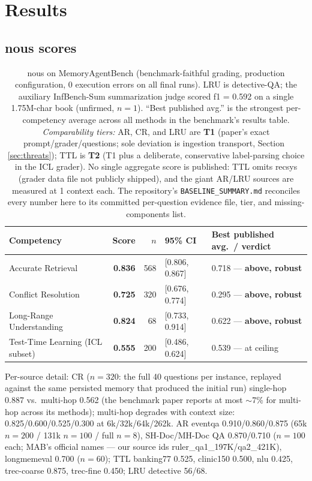\documentclass{article}
\newcommand{\nous}{\textsf{nous}}
\newcommand{\mab}{MemoryAgentBench}
\begin{document}
\section{Results}

\subsection{\nous{} scores}

\begin{table}[h]
\centering
\begin{tabular}{lrrll}
\toprule
Competency & Score & $n$ & 95\% CI & Best published avg.\ / verdict \\
\midrule
Accurate Retrieval        & \textbf{0.836} & 568 & [0.806, 0.867] & 0.718 --- \textbf{above, robust} \\
Conflict Resolution       & \textbf{0.725} & 320 & [0.676, 0.774] & 0.295 --- \textbf{above, robust} \\
Long-Range Understanding  & \textbf{0.824} & 68  & [0.733, 0.914] & 0.622 --- \textbf{above, robust} \\
Test-Time Learning (ICL subset) & \textbf{0.555} & 200 & [0.486, 0.624] & 0.539 --- at ceiling \\
\bottomrule
\end{tabular}
\caption{\nous{} on \mab{} (benchmark-faithful grading, production configuration,
0 execution errors on all final runs). LRU is detective-QA; the auxiliary
InfBench-Sum summarization judge scored f1 = 0.592 on a single 1.75M-char book
(unfirmed, $n{=}1$). ``Best published avg.'' is the strongest per-competency
average across all methods in the benchmark's results table.
\emph{Comparability tiers:} AR, CR, and LRU are \textbf{T1} (paper's exact
prompt/grader/questions; sole deviation is ingestion transport, Section~
\ref{sec:threats}); TTL is \textbf{T2} (T1 plus a deliberate, conservative
label-parsing choice in the ICL grader). No single aggregate score is
published: TTL omits recsys (grader data file not publicly shipped), and the
giant AR/LRU sources are measured at 1 context each. The repository's
\texttt{BASELINE\_SUMMARY.md} reconciles every number here to its committed
per-question evidence file, tier, and missing-components list.}
\label{tab:results}
\end{table}

Per-source detail: CR ($n{=}320$: the full 40 questions per instance,
replayed against the same persisted memory that produced the initial run)
single-hop 0.887 vs.\ multi-hop 0.562 (the benchmark paper reports at most
$\sim$7\% for multi-hop across its methods); multi-hop degrades with context
size: 0.825/0.600/0.525/0.300 at 6k/32k/64k/262k. AR eventqa
0.910/0.860/0.875 (65k $n{=}200$ / 131k $n{=}100$ / full $n{=}8$), SH-Doc/MH-Doc QA 0.870/0.710 ($n{=}100$ each; MAB's official names --- our source ids ruler\_qa1\_197K/qa2\_421K), longmemeval
0.700 ($n{=}60$); TTL banking77 0.525, clinic150 0.500, nlu 0.425, trec-coarse 0.875,
trec-fine 0.450; LRU detective 56/68.
\end{document}
